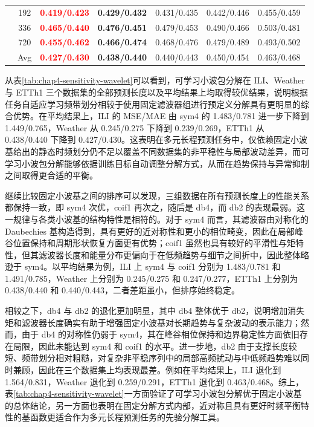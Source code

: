 \begin{table}[!htbp]
\begin{tabular}{c|c|c|c|c|c|c}
& 192 & \textbf{\textcolor{red}{0.419/0.423}} & \textbf{0.429/0.432} & 0.431/0.435 & 0.442/0.446 & 0.455/0.459 \\
& 336 & \textbf{\textcolor{red}{0.465/0.440}} & \textbf{0.476/0.451} & 0.479/0.453 & 0.490/0.466 & 0.503/0.481 \\
& 720 & \textbf{\textcolor{red}{0.455/0.462}} & \textbf{0.466/0.474} & 0.468/0.476 & 0.479/0.489 & 0.493/0.502 \\
& Avg & \textbf{\textcolor{red}{0.427/0.430}} & \textbf{0.438/0.440} & 0.440/0.443 & 0.450/0.454 & 0.463/0.468 \\
\bottomrule
\end{tabular}
\end{table}

从表\ref{tab:chap4-sensitivity-wavelet}可以看到，可学习小波包分解在 ILI、Weather 与 ETTh1 三个数据集的全部预测长度以及平均结果上均取得较优结果，说明根据任务自适应学习频带划分相较于使用固定滤波器组进行预定义分解具有更明显的综合优势。在平均结果上，ILI 的 MSE/MAE 由 sym4 的 1.483/0.781 进一步下降到 1.449/0.765，Weather 从 0.245/0.275 下降到 0.239/0.269，ETTh1 从 0.438/0.440 下降到 0.427/0.430。这表明在多元长程预测任务中，仅依赖固定小波基给出的静态时频划分仍不足以覆盖不同数据集的非平稳性与局部波动差异，而可学习小波包分解能够依据训练目标自动调整分解方式，从而在趋势保持与异常抑制之间取得更合适的平衡。

继续比较固定小波基之间的排序可以发现，三组数据在所有预测长度上的性能关系都保持一致，即 sym4 次优，coif1 再次之，随后是 db4，而 db2 的表现最弱。这一规律与各类小波基的结构特性是相符的。对于 sym4 而言，其滤波器由对称化的 Daubechies 基构造得到，具有更好的近对称性和更小的相位畸变，因此在局部峰谷位置保持和周期形状恢复方面更有优势；coif1 虽然也具有较好的平滑性与矩特性，但其滤波器长度和能量分布更偏向于在低频趋势与细节之间折中，因此整体略逊于 sym4。以平均结果为例，ILI 上 sym4 与 coif1 分别为 1.483/0.781 和 1.491/0.785，Weather 上分别为 0.245/0.275 和 0.247/0.277，ETTh1 上分别为 0.438/0.440 和 0.440/0.443，二者差距虽小，但排序始终稳定。

相较之下，db4 与 db2 的退化更加明显，其中 db4 整体优于 db2，说明增加消失矩和滤波器长度确实有助于增强固定小波基对长期趋势与复杂波动的表示能力；然而，由于 db4 的对称性仍弱于 sym4，其在峰谷相位保持和边界稳定性方面依旧存在局限，因此未能达到 sym4 和 coif1 的水平。进一步地，db2 由于支撑长度较短、频带划分相对粗糙，对复杂非平稳序列中的局部高频扰动与中低频趋势难以同时兼顾，因此在三个数据集上均表现最差。例如在平均结果上，ILI 退化到 1.564/0.831，Weather 退化到 0.259/0.291，ETTh1 退化到 0.463/0.468。综上，表\ref{tab:chap4-sensitivity-wavelet}一方面验证了可学习小波包分解优于固定小波基的总体结论，另一方面也表明在固定分解方式内部，近对称且具有更好时频平衡特性的基函数更适合作为多元长程预测任务的先验分解工具。

